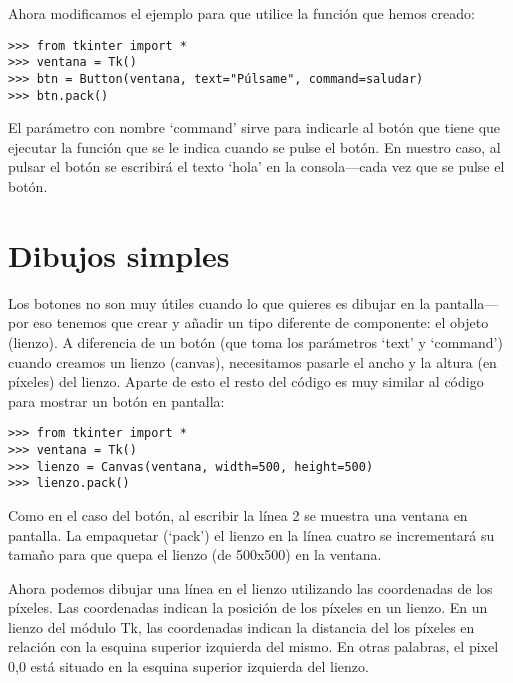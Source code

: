 \noindent
Ahora modificamos el ejemplo para que utilice la función que hemos creado:

\begin{listing}
\begin{verbatim}
>>> from tkinter import *
>>> ventana = Tk()
>>> btn = Button(ventana, text="Púlsame", command=saludar)
>>> btn.pack()
\end{verbatim}
\end{listing}

El parámetro con nombre `command' sirve para indicarle al botón que tiene que ejecutar la función que se le indica cuando se pulse el botón. En nuestro caso, al pulsar el botón se escribirá el texto `hola' en la consola---cada vez que se pulse el botón. 

\section{Dibujos simples}

Los botones no son muy útiles cuando lo que quieres es dibujar en la pantalla---por eso tenemos que crear y añadir un tipo diferente de componente: el objeto (lienzo). A diferencia de un botón (que toma los parámetros `text' y `command') cuando creamos un lienzo (canvas), necesitamos pasarle el ancho y la altura (en píxeles) del lienzo.  Aparte de esto el resto del código es muy similar al código para mostrar un botón en pantalla:

\begin{listing}
\begin{verbatim}
>>> from tkinter import *
>>> ventana = Tk()
>>> lienzo = Canvas(ventana, width=500, height=500)
>>> lienzo.pack()
\end{verbatim}
\end{listing}

Como en el caso del botón, al escribir la línea 2 se muestra una ventana en pantalla. La empaquetar (`pack') el lienzo en la línea cuatro se incrementará su tamaño para que quepa el lienzo (de 500x500) en la ventana.

Ahora podemos dibujar una línea en el lienzo utilizando las coordenadas de los píxeles.  Las coordenadas indican la posición de los píxeles en un lienzo.  En un lienzo del módulo Tk, las coordenadas indican la distancia del los píxeles en relación con la esquina superior izquierda del mismo. En otras palabras, el pixel 0,0 está situado en la esquina superior izquierda del lienzo.  


